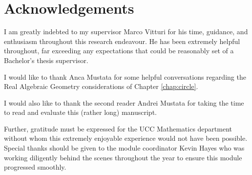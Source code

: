 \section*{Acknowledgements}
I am greatly indebted to my supervisor Marco Vitturi
for his time, guidance, and enthusiasm throughout this research endeavour.
He has been extremely helpful throughout, far exceeding any expectations that could be reasonably set of a Bachelor's thesis supervisor.

I would like to thank Anca Mustata for some helpful conversations regarding the Real Algebraic Geometry considerations of Chapter \ref*{chap:circle}.

I would also like to thank the second reader Andrei Mustata for taking the time to read and evaluate this (rather long) manuscript. 

Further, gratitude must be expressed for the UCC Mathematics department without whom this extremely enjoyable experience would not have been possible.
Special thanks should be given to the module coordinator Kevin Hayes who was working diligently behind the scenes throughout the year to ensure this module progressed smoothly.